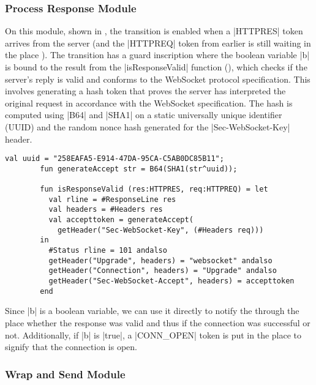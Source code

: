 		
		
	\subsubsection{Process Response Module}
		
		
		On this module, shown in , the transition
		 is enabled when a |HTTPRES| token arrives
		from the server (and the |HTTPREQ| token from earlier is still waiting in the
		place ). The transition has a guard
		inscription where the boolean variable |b| is bound to the result from the
		|isResponseValid| function (), which checks if the
		server's reply is valid and conforms to the WebSocket protocol specification.
		This involves generating a hash token that proves the server has interpreted
		the original request in accordance with the WebSocket specification. The hash
		is computed using |B64| and |SHA1| on a static universally unique identifier
		(UUID) and the random nonce hash generated for the |Sec-WebSocket-Key| header.
		
		\begin{lstlisting}[label=lst:isResponseValid,caption=isResponseValid,gobble=2,float]
		val uuid = "258EAFA5-E914-47DA-95CA-C5AB0DC85B11";
		fun generateAccept str = B64(SHA1(str^uuid));
		
		fun isResponseValid (res:HTTPRES, req:HTTPREQ) = let
		  val rline = #ResponseLine res
		  val headers = #Headers res
		  val accepttoken = generateAccept(
		    getHeader("Sec-WebSocket-Key", (#Headers req)))
		in
		  #Status rline = 101 andalso
		  getHeader("Upgrade", headers) = "websocket" andalso
		  getHeader("Connection", headers) = "Upgrade" andalso
		  getHeader("Sec-WebSocket-Accept", headers) = accepttoken
		end
		\end{lstlisting}
		
		Since |b| is a boolean variable, we can use it directly to
		notify the  through the  place
		whether the response was valid and thus if the connection was successful or not.
		Additionally, if |b| is |true|, a |CONN_OPEN| token is put in the
		 place to signify that the connection is open.
		
	\subsubsection{Wrap and Send Module}
		
